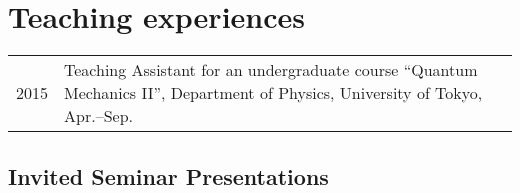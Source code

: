 \documentclass[12pt]{article}
\begin{document}
\section*{Teaching experiences}
\begin{table}[H]
  \begin{tabular}{lp{6in}}
    2015 & Teaching Assistant for an undergraduate course ``Quantum Mechanics II'', Department of Physics, University of Tokyo, Apr.--Sep.
  \end{tabular}
\end{table}



\nocite{*}

\subsection*{Invited Seminar Presentations}
\end{document}
